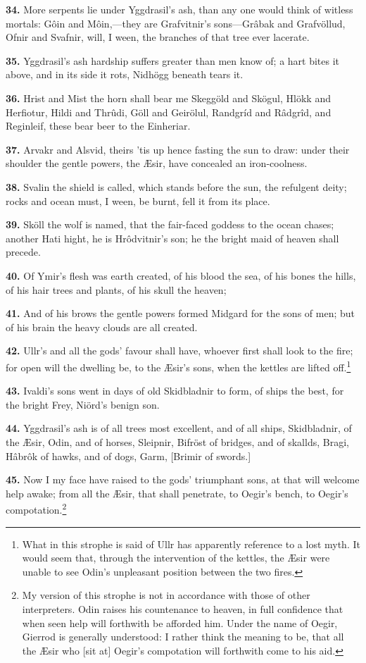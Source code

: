 \textbf{34.} More serpents lie under Yggdrasil's ash, than any one would
think of witless mortals: Gôin and Môin,—they are Grafvitnir's
sons—Grâbak and Grafvöllud, Ofnir and Svafnir, will, I ween, the
branches of that tree ever lacerate.

\textbf{35.} Yggdrasil's ash hardship suffers greater than men know of; a
hart bites it above, and in its side it rots, Nidhögg beneath tears
it.

\textbf{36.} Hrist and Mist the horn shall bear me Skeggöld and Skögul, Hlökk
and Herfiotur, Hildi and Thrûdi, Göll and Geirölul, Randgríd and
Râdgrîd, and Reginleif, these bear beer to the Einheriar.

\textbf{37.} Arvakr and Alsvid, theirs 'tis up hence fasting the sun to draw:
under their shoulder the gentle powers, the Æsir, have concealed an
iron-coolness.

\textbf{38.} Svalin the shield is called, which stands before the sun, the
refulgent deity; rocks and ocean must, I ween, be burnt, fell it from
its place.

\textbf{39.} Sköll the wolf is named, that the fair-faced goddess to the
ocean chases; another Hati hight, he is Hrôdvitnir's son; he the
bright maid of heaven shall precede.

\textbf{40.} Of Ymir's flesh was earth created, of his blood the sea, of his
bones the hills, of his hair trees and plants, of his skull the
heaven;

\textbf{41.} And of his brows the gentle powers formed Midgard for the sons
of men; but of his brain the heavy clouds are all created.

\textbf{42.} Ullr's and all the gods' favour shall have, whoever first shall
look to the fire; for open will the dwelling be, to the Æsir's sons,
when the kettles are lifted off.\footnote{What in this strophe is said of Ullr has apparently
reference to a lost myth. It would seem that, through the intervention
of the kettles, the Æsir were unable to see Odin's unpleasant position
between the two fires.}

\textbf{43.} Ivaldi's sons went in days of old Skidbladnir to form, of ships
the best, for the bright Frey, Niörd's benign son.

\textbf{44.} Yggdrasil's ash is of all trees most excellent, and of all
ships, Skidbladnir, of the Æsir, Odin, and of horses, Sleipnir,
Bifröst of bridges, and of skallds, Bragi, Hâbrôk of hawks, and of
dogs, Garm, [Brimir of swords.]

\textbf{45.} Now I my face have raised to the gods' triumphant sons, at that
will welcome help awake; from all the Æsir, that shall penetrate, to
Oegir's bench, to Oegir's compotation.\footnote{My version of this strophe is not in accordance with
those of other interpreters. Odin raises his countenance to heaven, in
full confidence that when seen help will forthwith be afforded him.
Under the name of Oegir, Gierrod is generally understood: I rather
think the meaning to be, that all the Æsir who [sit at] Oegir's
compotation will forthwith come to his aid.}

